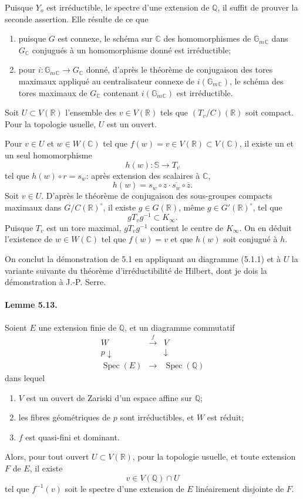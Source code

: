 \documentclass[10pt]{article}
\newcommand{\C}{\mathbb C}
\newcommand{\Gm}{\mathbb G_m}
\newcommand{\Q}{\mathbb Q}
\newcommand{\R}{\mathbb R}
\newcommand{\bS}{\mathbb S}
\newcommand{\Spec}{\operatorname{Spec}}
\begin{document}
Puisque $Y_o$ est irréductible, le spectre d'une extension de $\Q$, il suffit de prouver la seconde assertion. Elle résulte de ce que
\begin{enumerate}[label=(\alph*)]
\item puisque $G$ est connexe, le schéma sur $\C$ des homomorphismes de $\Gm{}_{\C}$ dans $G_{\C}$ conjugués à un homomorphisme donné est irréductible;
\item pour $i:\Gm{}_{\C}\to G_{\C}$ donné, d'après le théorème de conjugaison des tores maximaux appliqué au centralisateur connexe de $i(\Gm{}_{\C})$, le schéma des tores maximaux de $G_{\C}$ contenant $i(\Gm{}_{\C})$ est irréductible.
\end{enumerate}

Soit $U\subset V(\R)$ l'ensemble des $v\in V(\R)$ tels que $(T_v/C)(\R)$ soit compact. Pour la topologie usuelle, $U$ est un ouvert.

Pour $v\in U$ et $w\in W(\C)$ tel que $f(w)=v\in V(\R)\subset V(\C)$, il existe un et un seul homomorphisme
\[
h(w):\bS\longrightarrow T_v
\]
tel que $h(w)\circ r=s_w$: après extension des scalaires à $\C$,
\[
h(w)=s_w\circ z\cdot \overline{s_w}\circ\overline z.
\]
Soit $v\in U$. D'après le théorème de conjugaison des sous-groupes compacts maximaux dans $G/C(\R)^\circ$, il existe $g\in G(\R)$, même $g\in G'(\R)^\circ$, tel que
\[
gT_vg^{-1}\subset K_\infty.
\]
Puisque $T_v$ est un tore maximal, $gT_vg^{-1}$ contient le centre de $K_\infty$. On en déduit l'existence de $w\in W(\C)$ tel que $f(w)=v$ et que $h(w)$ soit conjugué à $h$.

On conclut la démonstration de 5.1 en appliquant au diagramme (5.1.1) et à $U$ la variante suivante du théorème d'irréductibilité de Hilbert, dont je dois la démonstration à J.-P. Serre.

\paragraph{Lemme 5.13.} Soient $E$ une extension finie de $\Q$, et un diagramme commutatif
\[
\begin{array}{ccc}
W & \xrightarrow{\ f\ } & V\\
{\scriptstyle p}\downarrow && \downarrow\\
\Spec(E) & \longrightarrow & \Spec(\Q)
\end{array}
\]
dans lequel
\begin{enumerate}[label=(\roman*)]
\item $V$ est un ouvert de Zariski d'un espace affine sur $\Q$;
\item les fibres géométriques de $p$ sont irréductibles, et $W$ est réduit;
\item $f$ est quasi-fini et dominant.
\end{enumerate}
Alors, pour tout ouvert $U\subset V(\R)$, pour la topologie usuelle, et toute extension $F$ de $E$, il existe
\[
v\in V(\Q)\cap U
\]
tel que $f^{-1}(v)$ soit le spectre d'une extension de $E$ linéairement disjointe de $F$.
\end{document}
